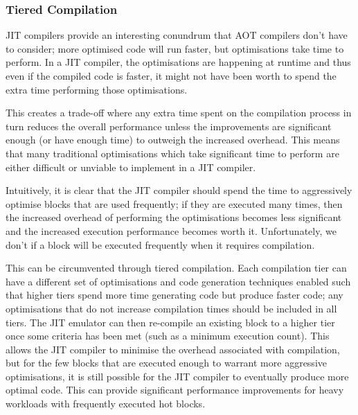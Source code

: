 \subsubsection{Tiered Compilation}

JIT compilers provide an interesting conundrum that AOT compilers don't have to consider; more optimised code will run faster, but optimisations take time to perform. In a JIT compiler, the optimisations are happening at runtime and thus even if the compiled code is faster, it might not have been worth to spend the extra time performing those optimisations.

This creates a trade-off where any extra time spent on the compilation process in turn reduces the overall performance unless the improvements are significant enough (or have enough time) to outweigh the increased overhead. This means that many traditional optimisations which take significant time to perform are either difficult or unviable to implement in a JIT compiler.

Intuitively, it is clear that the JIT compiler should spend the time to aggressively optimise blocks that are used frequently; if they are executed many times, then the increased overhead of performing the optimisations becomes less significant and the increased execution performance becomes worth it. Unfortunately, we don't if a block will be executed frequently when it requires compilation.

This can be circumvented through tiered compilation. Each compilation tier can have a different set of optimisations and code generation techniques enabled such that higher tiers spend more time generating code but produce faster code; any optimisations that do not increase compilation times should be included in all tiers. The JIT emulator can then re-compile an existing block to a higher tier once some criteria has been met (such as a minimum execution count). This allows the JIT compiler to minimise the overhead associated with compilation, but for the few blocks that are executed enough to warrant more aggressive optimisations, it is still possible for the JIT compiler to eventually produce more optimal code. This can provide significant performance improvements for heavy workloads with frequently executed hot blocks.
